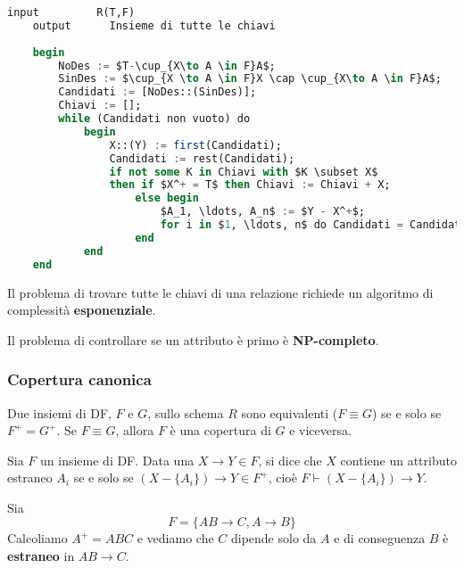 \begin{lstlisting}[language=SQL, mathescape]
	input		  R(T,F)
	output		Insieme di tutte le chiavi
	
	begin
		NoDes := $T-\cup_{X\to A \in F}A$;
		SinDes := $\cup_{X \to A \in F}X \cap \cup_{X\to A \in F}A$;
		Candidati := [NoDes::(SinDes)];
		Chiavi := [];
		while (Candidati non vuoto) do
			begin
				X::(Y) := first(Candidati);
				Candidati := rest(Candidati);
				if not some K in Chiavi with $K \subset X$
				then if $X^+ = T$ then Chiavi := Chiavi + X;
					else begin
						$A_1, \ldots, A_n$ := $Y - X^+$;
						for i in $1, \ldots, n$ do Candidati = Candidati.append($XA_i$::($A_{i+1}, \ldots, A_n$))
					end
			end
	end
\end{lstlisting}

\begin{note}
	Il problema di trovare tutte le chiavi di una relazione richiede un algoritmo di complessità \textbf{esponenziale}.
\end{note}

\begin{note}
	Il problema di controllare se un attributo è primo è \textbf{NP-completo}.
\end{note}

\subsubsection{Copertura canonica}
\begin{definition}[Copertura]
	Due insiemi di DF, $F$ e $G$, sullo schema $R$ sono	equivalenti ($F\equiv G$) se e solo se $F^+ = G^+$. Se $F \equiv G$, allora $F$ è una copertura di $G$ e viceversa.
\end{definition}

\begin{definition}
	Sia $F$ un insieme di DF. Data una $X \to Y \in F$, si dice che $X$ contiene un attributo estraneo $A_i$
	se e solo se $(X - \{A_i\}) \to Y \in F^+$, cioè $F \vdash (X - \{A_i\}) \to Y$.
\end{definition}

\begin{example}
	Sia
	\begin{equation*}
		F = \{AB \to C, A \to B\}
	\end{equation*}
	Calcoliamo $A^+ = ABC$ e vediamo che $C$ dipende solo da $A$ e di conseguenza $B$ è \textbf{estraneo} in $AB \to C$.
\end{example}

